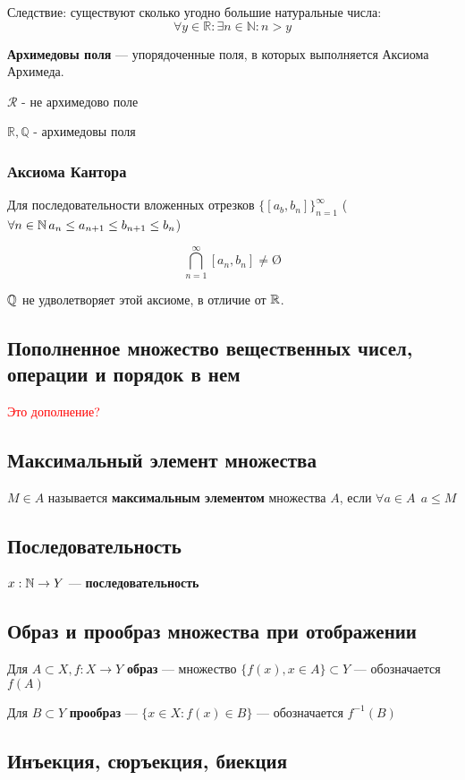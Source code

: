 Следствие: существуют сколько угодно большие натуральные числа: $$\forall y\in \mathbb{R}: \exists n\in\mathbb{N}: n>y$$

\textbf{Архимедовы поля} --- упорядоченные поля, в которых выполняется Аксиома Архимеда.

$\mathcal{R}$ - не архимедово поле

$\mathbb{R}, \mathbb{Q}$ - архимедовы поля

\subsubsection{Аксиома Кантора}

Для последовательности вложенных отрезков $\{[a_b,b_n]\}_{n=1}^\infty$ ($\forall n\in\operatorname*{\mathbb{N}} a_n\leq a_{n+1}\leq b_{n+1}\leq b_n$)

$$\bigcap\limits_{n=1}^\infty[a_n, b_n] \not = \text{\O}$$

$\operatorname*{\mathbb{Q}}$ не удволетворяет этой аксиоме, в отличие от $\operatorname*{\mathbb{R}}$.

\subsection{Пополненное множество вещественных чисел, операции и порядок в нем}
\textcolor{red}{Это дополнение?}

\subsection{Максимальный элемент множества}
$M\in A$ называется \textbf{максимальным элементом} множества $A$, если $\forall a\in A \ \ a\leq M$

\subsection{Последовательность}

$x:\operatorname*{\mathbb{N}} \rightarrow Y$ --- \textbf{последовательность}

\subsection{Образ и прообраз множества при отображении}

Для $A\subset X, f:X\to Y$ \textbf{образ} --- множество $\{f(x), x\in A\} \subset Y$ --- обозначается $f(A)$


Для $B\subset Y$ \textbf{прообраз} --- $\{ x\in X : f(x)\in B \}$ --- обозначается $f^{-1}(B)$

\subsection{Инъекция, сюръекция, биекция}

